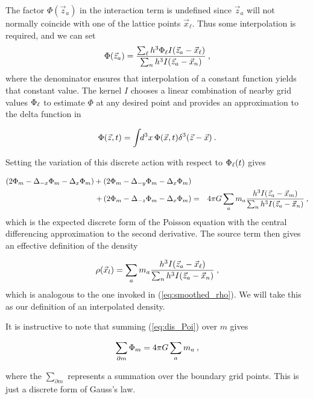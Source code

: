 The factor $\Phi(\vec z_a)$ in the interaction term is undefined since
$\vec z_a$ will not normally coincide with one of the lattice points
$\vec x_\ell$.  Thus some interpolation is required, and we can set
\begin{equation}\label{eq:interpolate}
      \Phi({\vec z}_a) = \frac{\sum_{\ell} h^3 \Phi_{\ell} I({\vec z}_a - {\vec x}_{\ell})}
                  {\sum_n h^3 I({\vec z}_a -{\vec x}_n)} \: ,
\end{equation}
%
where the denominator ensures that interpolation of a constant function yields
that constant value.  The kernel $I$ chooses a linear combination of nearby
grid values ${\Phi_{\ell}}$ to estimate $\Phi$ at any desired point and provides an
approximation to the delta function in

\begin{equation}\label{eq:approxDelta}
    \Phi({\vec z},t) = \int\!\!d^3x\,\Phi({\vec x},t) \delta^3({\vec z}-{\vec x}) \: .
\end{equation}

Setting the variation of this discrete action with respect to ${\Phi_{\ell}}(t)$ gives

\begin{eqnarray}\label{eq:dis_Poi}
  \left( 2 {\Phi}_m - {\Delta}_{-x} {\Phi}_m - {\Delta}_x {\Phi}_m \right) +
  \left( 2 {\Phi}_m - {\Delta}_{-y} {\Phi}_m - {\Delta}_x {\Phi}_m \right) \nonumber & & \\
+ \left( 2 {\Phi}_m - {\Delta}_{-z} {\Phi}_m - {\Delta}_x {\Phi}_m \right) & = & 4 \pi G \sum_{a} m_a
  \frac{ h^3 I({\vec z}_a - {\vec x}_m)}{\sum_n h^3 I({\vec z}_a -{\vec x}_n)} \: ,
\end{eqnarray}
%
which is the expected discrete form of the Poisson equation with the central
differencing approximation to the second derivative.  The source term then
gives an effective definition of the density

\begin{equation}\label{eq:dis_den}
   \rho({\vec x}_l) = \sum_{a} m_a \frac{ h^3 I({\vec z}_a - {\vec x}_{\ell})}{\sum_n h^3 I({\vec z}_a -{\vec x}_n)} \: ,
\end{equation}
which is analogous to the one invoked in (\ref{eq:smoothed_rho}).  We will take
this as our definition of an interpolated density.

It is instructive to note that summing (\ref{eq:dis_Poi}) over $m$ gives

\begin{equation}
  \sum_{\partial m} {\Phi}_m = 4 \pi G \sum_{a} m_{a} \: ,
\end{equation}

where the $\sum_{\partial m}$ represents a summation over the boundary grid
points.  This is just a discrete form of Gauss's law.

